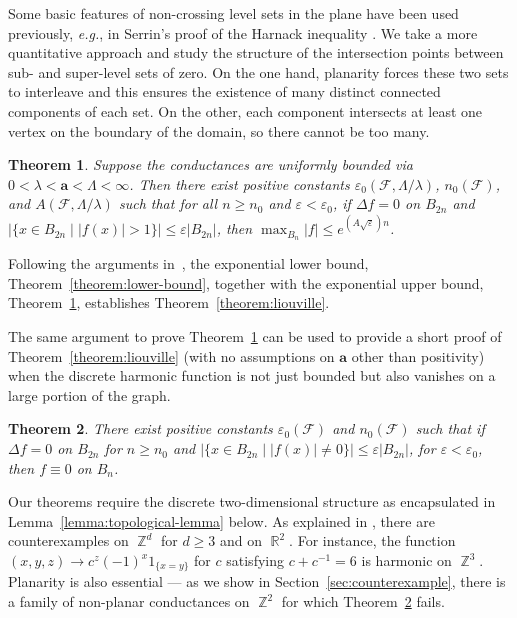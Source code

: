 \documentclass{daj}
\newtheorem{theorem}{Theorem}[section]
\newcommand{\cond}{\mathbf{a}}
\newcommand{\eps}{\varepsilon}
\DeclareMathOperator{\R}{\mathbb{R}}
\DeclareMathOperator{\Z}{\mathbb{Z}}
\newcommand{\eg}{{\it e.g.}}
\begin{document}
Some basic features of non-crossing level sets in the plane have been used previously, \eg, in Serrin's proof of the Harnack inequality \cite{MR0081415}. We take a more quantitative approach and study the structure of the intersection points between sub- and super-level sets of zero. On the one hand, planarity forces these two sets to interleave and this ensures the existence of many distinct connected components of each set. On the other, each component intersects at least one vertex on the boundary of the domain, so there cannot be too many.
\begin{theorem}\label{theorem:uniformly-bounded}
	Suppose the conductances are uniformly bounded via $0 < \lambda < \cond < \Lambda < \infty$.
	Then there exist positive constants $\eps_0(\mathcal{F}, \Lambda/\lambda)$, $n_0(\mathcal{F})$, and $A(\mathcal{F}, \Lambda/\lambda)$
	such that for all $n \geq n_0$ and $\eps < \eps_0$,
	if $\Delta f = 0$ on $B_{2 n}$
	and $|\{x \in B_{2n} \mid  |f(x)| > 1\}| \leq \eps |B_{2n}|$, then $\max_{B_{n}} |f| \leq e^{(A \sqrt{\eps}) n} $.
\end{theorem}
Following the arguments in~\cite{buhovsky2022discrete}, the exponential lower bound, Theorem~\ref{theorem:lower-bound}, together with the exponential upper bound, Theorem~\ref{theorem:uniformly-bounded}, establishes Theorem~\ref{theorem:liouville}.


The same argument to prove Theorem~\ref{theorem:uniformly-bounded} can be used to provide a short proof of Theorem~\ref{theorem:liouville}
(with no assumptions on $\cond$ other than positivity) when the discrete harmonic function is not just bounded but also vanishes on a large portion of the graph.
\begin{theorem}\label{theorem:zero-case}
	There exist positive constants $\eps_0(\mathcal{F})$ and $n_0(\mathcal{F})$ such that if $\Delta f = 0$ on $B_{2 n}$ for $n \geq n_0$
	and $|\{x \in B_{2n} \mid |f(x)| \neq 0\}| \leq \eps |B_{2n}|$, for $\eps < \eps_0$, then $f \equiv 0$ on $B_n$.
\end{theorem}


Our theorems require the discrete two-dimensional structure as encapsulated in Lemma~\ref{lemma:topological-lemma} below.
As explained in \cite[Remark 1.3]{buhovsky2022discrete}, there are counterexamples on $\Z^d$ for $d \geq 3$ and on $\R^2$.
For instance, the function $(x,y,z) \to c^z (-1)^x  1_{\{x = y \}}$ for $c$ satisfying $c + c^{-1} = 6$ is harmonic on $\Z^3$. Planarity is also essential --- as we show in Section~\ref{sec:counterexample}, there is a family of non-planar conductances on $\Z^2$ for which Theorem~\ref{theorem:zero-case} fails.
\end{document}
